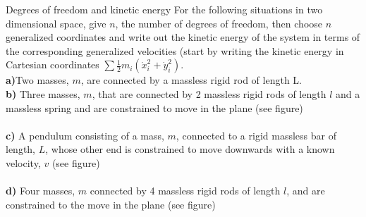 \begin{problem}{Degrees of freedom and kinetic energy}
\label{prob_Intro_2}
For the following situations in two dimensional space, give $n$, the number of degrees of freedom, then choose $n$ generalized coordinates and write out the kinetic energy of the system in terms of the corresponding generalized velocities (start by writing the kinetic energy in Cartesian coordinates $\sum \frac{1}{2}m_i(\dot x_i^2+\dot y_i^2)$.\\
\textbf{a)}Two masses, $m$, are connected by a massless rigid rod of length L.\\
\textbf{b)} Three masses, $m$, that are connected by 2 massless rigid rods of length $l$ and a massless spring and are constrained to move in the plane (see figure)\\
\\
\textbf{c)} A pendulum consisting of a mass, $m$, connected to a rigid massless bar of length, $L$, whose other end is constrained to move downwards with a known velocity, $v$ (see figure)\\
\\
\textbf{d)} Four masses, $m$ connected by 4 massless rigid rods of length $l$, and are constrained to the move in the plane (see figure)\\
\end{problem}
%
%
